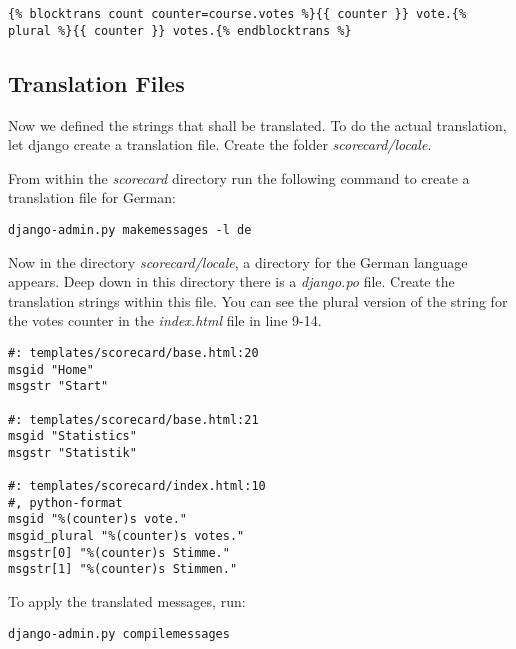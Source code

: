 \begin{lstlisting}[style=HTML, caption=exceprt of index.html with translation, label=lst:index.html_translation]
{% blocktrans count counter=course.votes %}{{ counter }} vote.{% plural %}{{ counter }} votes.{% endblocktrans %}
\end{lstlisting}

\subsection{Translation Files}
Now we defined the strings that shall be translated. To do the actual translation, let django create a translation file. Create the folder \emph{scorecard/locale}.

From within the \emph{scorecard} directory run the following command to create a translation file for German:

\begin{lstlisting}[style=Bash, caption=Create a German translation file, label=lst:makemessages]
django-admin.py makemessages -l de
\end{lstlisting}

Now in the directory \emph{scorecard/locale}, a directory for the German language appears. Deep down in this directory there is a \emph{django.po} file. Create the translation strings within this file. You can see the plural version of the string for the votes counter in the \emph{index.html} file in line 9-14.

\begin{lstlisting}[style=HTML, caption=django.po file for German, label=lst:django.po]
#: templates/scorecard/base.html:20
msgid "Home"
msgstr "Start"

#: templates/scorecard/base.html:21
msgid "Statistics"
msgstr "Statistik"

#: templates/scorecard/index.html:10
#, python-format
msgid "%(counter)s vote."
msgid_plural "%(counter)s votes."
msgstr[0] "%(counter)s Stimme."
msgstr[1] "%(counter)s Stimmen."
\end{lstlisting}

To apply the translated messages, run:
\begin{lstlisting}[style=Bash, caption=Compile messages, label=lst:compilemessages]
django-admin.py compilemessages
\end{lstlisting}